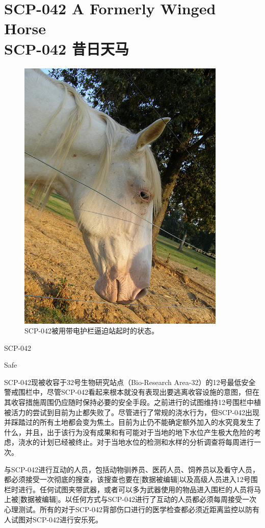 \chapter[SCP-042 昔日天马]{
    SCP-042 A Formerly Winged Horse\\
    SCP-042 昔日天马
}

\label{chap:SCP-042}

\begin{figure}[H]
    \centering
    \includegraphics[width=0.5\linewidth]{images/SCP.042.jpg}
    \caption*{SCP-042被用带电护栏逼迫站起时的状态。}
\end{figure}

SCP-042

Safe

SCP-042现被收容于32号生物研究站点（Bio-Research Area-32）的12号最低安全警戒围栏中，尽管SCP-042看起来根本就没有表现出要逃离收容设施的意图，但在其收容措施周围仍应随时保持必要的安全手段。之前进行的试图维持12号围栏中植被活力的尝试到目前为止都失败了。尽管进行了常规的浇水行为，但SCP-042出现并踩踏过的所有土地都会变为焦土。目前为止仍不能确定额外加入的水究竟发生了什么，并且，出于该行为没有成果和有可能对于当地的地下水位产生极大危险的考虑，浇水的计划已经被终止。对于当地水位的检测和水样的分析调查将每周进行一次。

与SCP-042进行互动的人员，包括动物驯养员、医药人员、饲养员以及看守人员，都必须接受一次彻底的搜查，该搜查也要在{[}数据被编辑]以及高级人员进入12号围栏时进行。任何试图夹带武器，或者可以多为武器使用的物品进入围栏的人员将马上被{[}数据被编辑]。以任何方式与SCP-042进行了互动的人员都必须每周接受一次心理测试。所有的对于SCP-042背部伤口进行的医学检查都必须近距离监控以防有人试图对SCP-042进行安乐死。

